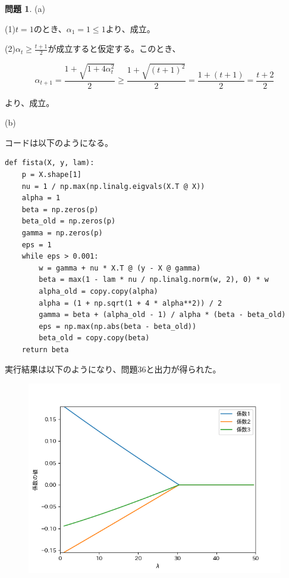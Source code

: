 \documentclass[titlepage]{jsarticle}
\theoremstyle{definition}
\newtheorem{Ex}{問題}
\theoremstyle{mystyle} %
\begin{document}
\begin{Ex}
\noindent(a)

\noindent(1)$t = 1$のとき、$\alpha_1=1\le 1$より、成立。

\noindent(2)$\alpha_t\ge \frac{t+1}{2}$が成立すると仮定する。このとき、

\begin{equation*}
\alpha_{t+1}=\frac{1+\sqrt{1+4\alpha_t^2}}{2}\ge \frac{1+\sqrt{(t+1)^2}}{2}=\frac{1+(t+1)}{2}=\frac{t+2}{2}
\end{equation*}

より、成立。

\noindent(b)

コードは以下のようになる。

\begin{lstlisting}
def fista(X, y, lam):
    p = X.shape[1]
    nu = 1 / np.max(np.linalg.eigvals(X.T @ X))
    alpha = 1
    beta = np.zeros(p)
    beta_old = np.zeros(p)
    gamma = np.zeros(p)
    eps = 1
    while eps > 0.001:
        w = gamma + nu * X.T @ (y - X @ gamma)
        beta = max(1 - lam * nu / np.linalg.norm(w, 2), 0) * w
        alpha_old = copy.copy(alpha)
        alpha = (1 + np.sqrt(1 + 4 * alpha**2)) / 2
        gamma = beta + (alpha_old - 1) / alpha * (beta - beta_old)
        eps = np.max(np.abs(beta - beta_old))
        beta_old = copy.copy(beta)
    return beta
\end{lstlisting}

実行結果は以下のようになり、問題36と出力が得られた。

\begin{figure}[H]
 \centering
 \includegraphics[keepaspectratio, scale=0.7]{fista.png}
\end{figure}
\end{Ex}
\end{document}
